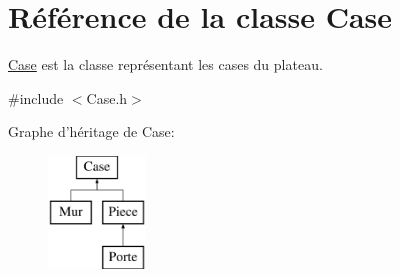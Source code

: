 \hypertarget{classCase}{\section{\-Référence de la classe \-Case}
\label{classCase}
}


\hyperlink{classCase}{\-Case} est la classe représentant les cases du plateau.  




{\ttfamily \#include $<$\-Case.\-h$>$}

\-Graphe d'héritage de \-Case\-:\begin{figure}[H]
\begin{center}
\leavevmode
\includegraphics[height=3.000000cm]{classCase}
\end{center}
\end{figure}
